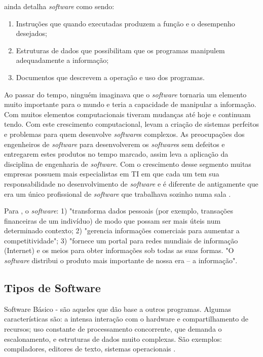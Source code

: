  ainda detalha \textit{software} como sendo: 

\begin{enumerate}
    \item Instruções que quando executadas produzem a função e o desempenho desejados;
    \item Estruturas de dados que possibilitam que os programas manipulem adequadamente a informação;
    \item Documentos que descrevem a operação e uso dos programas.
\end{enumerate}
    

\begin{citacao}
Ao passar do tempo, ninguém imaginava que o \textit{software} tornaria um elemento muito importante para o mundo e teria a capacidade de manipular a informação. Com muitos elementos computacionais tiveram mudanças até hoje e continuam tendo. Com este crescimento computacional, levam a criação de sistemas perfeitos e problemas para quem desenvolve \textit{software}s
complexos. As preocupações dos engenheiros de \textit{software} para
desenvolverem os \textit{software}s sem defeitos e entregarem estes produtos no tempo marcado, assim leva a aplicação da disciplina de engenharia de \textit{software}. Com o crescimento desse segmento muitas empresas possuem mais especialistas em TI em que cada um tem sua responsabilidade no desenvolvimento de \textit{software} e é diferente de antigamente que era um único
profissional de \textit{software} que trabalhava sozinho numa sala \cite[p. 39]{PRESSMAN2007}.
\end{citacao}

Para \cite[p. 31]{PRESSMAN2011}, o \textit{software}: 1) "transforma dados pessoais (por exemplo, transações financeiras de um indivíduo) de modo que possam ser mais úteis num determinado contexto; 2) "gerencia informações comerciais para aumentar a competitividade"; 3) "fornece um portal para redes mundiais de informação (Internet) e os meios para obter informações sob todas as suas formas. "O \textit{software} distribui o produto mais importante de nossa era – a
informação".

\subsection{Tipos de Software}

Software Básico - são aqueles que dão base a outros programas. Algumas características são:  a intensa interação com o hardware e compartilhamento de recursos; uso constante de processamento concorrente, que demanda o escalonamento, e estruturas de dados muito complexas. São exemplos: compiladores, editores de texto, sistemas operacionais \cite{PRESSMAN2007}.

